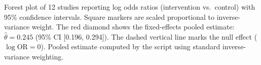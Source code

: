 \caption{Forest plot of 12 studies reporting log odds ratios (intervention vs.\ control) with 95\% confidence intervals. Square markers are scaled proportional to inverse-variance weight. The red diamond shows the fixed-effects pooled estimate: $\hat{\theta} = 0.245$ (95\% CI [0.196, 0.294]). The dashed vertical line marks the null effect ($\log\text{OR} = 0$). Pooled estimate computed by the script using standard inverse-variance weighting.}
